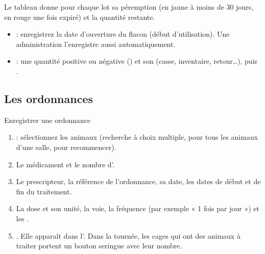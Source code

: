 \documentclass[11pt,a4paper]{article}
\begin{document}
Le tableau  donne pour chaque lot sa péremption (en jaune
à moins de 30 jours, en rouge une fois expiré) et la quantité restante.
\begin{itemize}
  \item {} : enregistrez la date d'ouverture du flacon (début
    d'utilisation). Une administration l'enregistre aussi automatiquement.
  \item {} : une quantité positive ou négative (\btn{+ / -}) et
    son  (casse, inventaire, retour…), puis .
\end{itemize}

\subsection{Les ordonnances}
\begin{procedure}{Enregistrer une ordonnance}
\begin{enumerate}
  \item {} : sélectionnez les animaux (recherche à choix
    multiple,  pour tous les animaux d'une salle,
     pour recommencer).
  \item Le médicament et le nombre d'.
  \item Le prescripteur, la référence de l'ordonnance, sa date, les dates de
    début et de fin du traitement.
  \item La dose et son unité, la voie, la fréquence (par exemple « 1 fois
    par jour ») et les .
  \item {}. Elle apparaît dans
    l'. Dans la tournée, les cages qui ont des animaux à
    traiter portent un bouton seringue avec leur nombre.
\end{enumerate}
\end{procedure}
\end{document}
